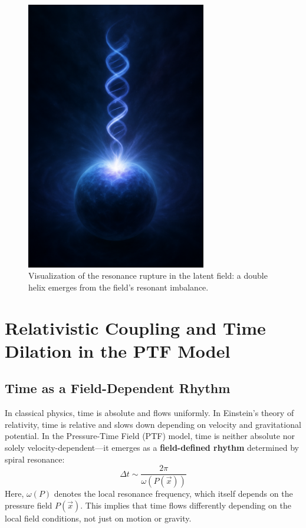 \documentclass[a4paper,12pt]{article}
\begin{document}
\begin{figure}[H]
    \centering
    \includegraphics[width=0.7\textwidth]{resonansbrud_spiralfelt.png}
    \caption{Visualization of the resonance rupture in the latent field: a double helix emerges from the field’s resonant imbalance.}
    \label{fig:resonansbrud}
\end{figure}

\newpage
\section{Relativistic Coupling and Time Dilation in the PTF Model}

\subsection{Time as a Field-Dependent Rhythm}

In classical physics, time is absolute and flows uniformly. In Einstein’s theory of relativity, time is relative and slows down depending on velocity and gravitational potential. In the Pressure-Time Field (PTF) model, time is neither absolute nor solely velocity-dependent—it emerges as a \textbf{field-defined rhythm} determined by spiral resonance:
\[
\Delta t \sim \frac{2\pi}{\omega(P(\vec{x}))}
\]
Here, \(\omega(P)\) denotes the local resonance frequency, which itself depends on the pressure field \(P(\vec{x})\). This implies that time flows differently depending on the local field conditions, not just on motion or gravity.
\end{document}
